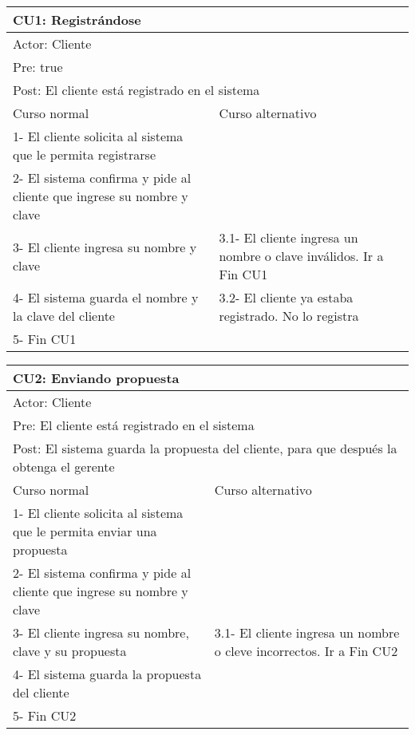 \begin{table}[H]
  \begin{adjustbox}{max width = \textwidth}
  \begin{tabular}{|l|l|}
  \hline
  \multicolumn{2}{|l|}{CU1: Registrándose} \\\hline
  \multicolumn{2}{|l|}{Actor: Cliente} \\\hline
  \multicolumn{2}{|l|}{Pre: true} \\\hline
  \multicolumn{2}{|l|}{Post: El cliente está registrado en el sistema} \\\hline
   Curso normal & Curso alternativo\\ \hline
   1- El cliente solicita al sistema que le permita registrarse & \\ \hline
   2- El sistema confirma y pide al cliente que ingrese su nombre y clave & \\ \hline
   3- El cliente ingresa su nombre y clave & 3.1- El cliente ingresa un nombre o clave inválidos. Ir a Fin CU1\\ \hline
   4- El sistema guarda el nombre y la clave del cliente & 3.2- El cliente ya estaba registrado. No lo registra\\ \hline
   5- Fin CU1 & \\ \hline
  \end{tabular}
  \end{adjustbox}
\end{table}

\begin{table}[H]
  \begin{adjustbox}{max width = \textwidth}
  \begin{tabular}{|l|l|}
    \hline
    \multicolumn{2}{|l|}{CU2: Enviando propuesta} \\\hline
    \multicolumn{2}{|l|}{Actor: Cliente} \\\hline
    \multicolumn{2}{|l|}{Pre: El cliente está registrado en el sistema} \\\hline
    \multicolumn{2}{|l|}{Post: El sistema guarda la propuesta del cliente, para que después la obtenga el gerente} \\\hline
     Curso normal & Curso alternativo\\ \hline
     1- El cliente solicita al sistema que le permita enviar una propuesta & \\ \hline
     2- El sistema confirma y pide al cliente que ingrese su nombre y clave & \\ \hline
     3- El cliente ingresa su nombre, clave y su propuesta  & 3.1- El cliente ingresa un nombre o cleve incorrectos. Ir a Fin CU2\\ \hline
     4- El sistema guarda la propuesta del cliente & \\ \hline
     5- Fin CU2 & \\ \hline
  \end{tabular}
  \end{adjustbox}
\end{table}

